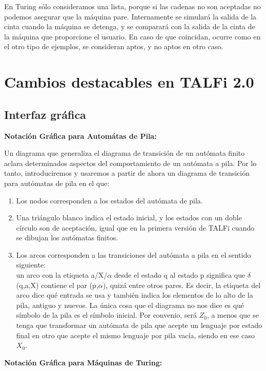 \documentclass[12pt,a4paper,spanish]{book}
\begin{document}
En Turing s\'olo consideramos una lista, porque si las cadenas no son aceptadas no podemos asegurar que la m\'aquina pare. Internamente se simular\'a la salida de la cinta cuando la m\'aquina se detenga, y se comparar\'a con la salida de la cinta de la m\'aquina que proporcione el usuario. En caso de que coincidan, ocurre como en el otro tipo de ejemplos, se consideran aptos, y no aptos en otro caso.

\newpage
\section{Cambios destacables en TALFi 2.0}
\subsection{Interfaz gr\'afica}
\noindent
{\bf Notaci\'on Gr\'afica para Autom\'atas de Pila:\\}

Un diagrama que generaliza el diagrama de transici\'on de un aut\'omata finito
aclara determinados aspectos del comportamiento de un aut\'omata a pila. Por lo
tanto, introduciremos y usaremos a partir de ahora un diagrama de transici\'on para
aut\'omatas de pila en el que:
\begin{enumerate}
\item Los nodos corresponden a los estados del aut\'omata de pila.
\item Una tri\'angulo blanco indica el estado inicial, y los estados con un doble c\'irculo
son de aceptaci\'on, igual que en la primera versi\'on de TALFi cuando se dibujan los
aut\'omatas finitos.
\item Los arcos corresponden a las transiciones del aut\'omata a pila en el sentido
siguiente:\\ un arco con la etiqueta a/X/$\alpha$ desde el estado q al estado p significa
que $\delta$(q,a,X) contiene el par (p,$\alpha$), quiz\'a entre otros pares. Es decir, la
etiqueta del arco dice qu\'e entrada se usa y tambi\'en indica los elementos de lo alto
de la pila, antiguo y nuevos.
La \'unica cosa que el diagrama no nos dice es qu\'e s\'imbolo de la pila es el s\'imbolo
inicial. Por convenio, ser\'a $Z_{0}$, a menos que se tenga que transformar un
aut\'omata de pila que acepte un lenguaje por estado final en otro que acepte el mismo
lenguaje por pila vac\'ia, siendo en ese caso $X_{0}$.\\
\end{enumerate}
{\bf Notaci\'on Gr\'afica para M\'aquinas de Turing:\\}
\end{document}
